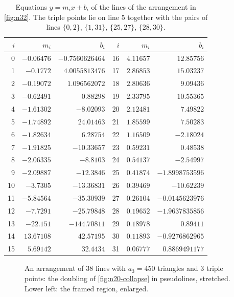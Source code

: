 \begin{table}[t]
\centering
\small
\caption{Equations $y=m_ix+b_i$ of the lines of the arrangement in \cref{fig:n32}. The triple points lie on line 5 together with the pairs of lines $\{0,2\}$, $\{1,31\}$, $\{25,27\}$, $\{28,30\}$.}
\label{tab:n32-lines}
\renewcommand{\arraystretch}{1.15}
\begin{tabular}{rrr@{\qquad}rrr}
\toprule
$i$ & $m_i$ & $b_i$ & $i$ & $m_i$ & $b_i$ \\
\midrule
0 & $-0.06476$ & $-0.7560626464$ & 16 & $4.11657$ & $12.85756$ \\
1 & $-0.1772$ & $4.0055813476$ & 17 & $2.86853$ & $15.03237$ \\
2 & $-0.19072$ & $1.096562072$ & 18 & $2.80636$ & $9.09436$ \\
3 & $-0.62491$ & $0.88298$ & 19 & $2.33795$ & $10.55365$ \\
4 & $-1.61302$ & $-8.02093$ & 20 & $2.12481$ & $7.49822$ \\
5 & $-1.74892$ & $24.01463$ & 21 & $1.85599$ & $7.50283$ \\
6 & $-1.82634$ & $6.28754$ & 22 & $1.16509$ & $-2.18024$ \\
7 & $-1.91825$ & $-10.33657$ & 23 & $0.59231$ & $0.48538$ \\
8 & $-2.06335$ & $-8.8103$ & 24 & $0.54137$ & $-2.54997$ \\
9 & $-2.09887$ & $-12.3846$ & 25 & $0.41874$ & $-1.8998753596$ \\
10 & $-3.7305$ & $-13.36831$ & 26 & $0.39469$ & $-10.62239$ \\
11 & $-5.84564$ & $-35.30939$ & 27 & $0.26104$ & $-0.0145623976$ \\
12 & $-7.7291$ & $-25.79848$ & 28 & $0.19652$ & $-1.9637835856$ \\
13 & $-22.151$ & $-144.70811$ & 29 & $0.18978$ & $0.89411$ \\
14 & $13.67108$ & $42.57195$ & 30 & $0.11893$ & $-0.9276862965$ \\
15 & $5.69142$ & $32.4434$ & 31 & $0.06777$ & $0.8869491177$ \\
\bottomrule
\end{tabular}
\end{table}

\begin{figure}[p]
\noindent\unskip{}
\caption{An arrangement of 38 lines with $a_3=450$ triangles and 3 triple points: the doubling of \cref{fig:n20-collapse} in pseudolines, stretched. Lower left: the framed region, enlarged.}
\label{fig:n38}
\end{figure}

